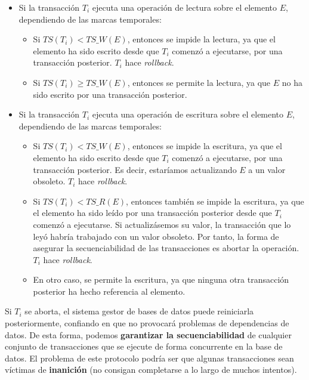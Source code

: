 \documentclass[12pt, a4paper]{article}
\begin{document}
\begin{itemize}
    \item Si la transacción $T_i$ ejecuta una operación de lectura sobre el elemento $E$, dependiendo de las marcas temporales:
    \begin{itemize}
        \item Si $TS(T_i) < TS\_W(E)$, entonces se impide la lectura, ya que el elemento ha sido escrito desde que $T_i$ comenzó a ejecutarse, por una transacción posterior. $T_i$ hace \textit{rollback}.
        \item Si $TS(T_i) \geq TS\_W(E)$, entonces se permite la lectura, ya que $E$ no ha sido escrito por una transacción posterior.
    \end{itemize}
    \item Si la transacción $T_i$ ejecuta una operación de escritura sobre el elemento $E$, dependiendo de las marcas temporales:
    \begin{itemize}
        \item Si $TS(T_i) < TS\_W(E)$, entonces se impide la escritura, ya que el elemento ha sido escrito desde que $T_i$ comenzó a ejecutarse, por una transacción posterior. Es decir, estaríamos actualizando $E$ a un valor obsoleto. $T_i$ hace \textit{rollback}.
        \item Si $TS(T_i) < TS\_R(E)$, entonces también se impide la escritura, ya que el elemento ha sido leído por una transacción posterior desde que $T_i$ comenzó a ejecutarse. Si actualizásemos su valor, la transacción que lo leyó habría trabajado con un valor obsoleto. Por tanto, la forma de asegurar la secuenciabilidad de las transacciones es abortar la operación. $T_i$ hace \textit{rollback}.
        \item En otro caso, se permite la escritura, ya que ninguna otra transacción posterior ha hecho referencia al elemento.
    \end{itemize}
\end{itemize}

Si $T_i$ se aborta, el sistema gestor de bases de datos puede reiniciarla posteriormente, confiando en que no provocará problemas de dependencias de datos. De esta forma, podemos \textbf{garantizar la secuenciabilidad} de cualquier conjunto de transacciones que se ejecute de forma concurrente en la base de datos. El problema de este protocolo podría ser que algunas transacciones sean víctimas de \textbf{inanición} (no consigan completarse a lo largo de muchos intentos).

\nocite{*}

\end{document}
